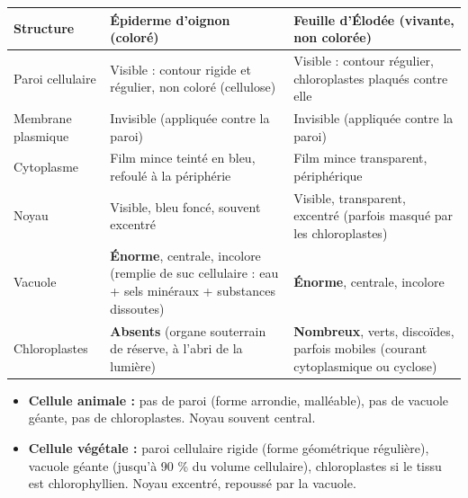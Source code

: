 \documentclass[11pt]{article}
\newcommand{\cle}[1]{{\popxbold\color{popdark}#1}}
\begin{document}
\begin{center}
\begin{tabularx}{\linewidth}{|l|X|X|}
\hline
\rowcolor{popblueL}
\textbf{Structure} & \textbf{Épiderme d'oignon (coloré)} & \textbf{Feuille d'Élodée (vivante, non colorée)} \\
\hline
\cle{Paroi cellulaire} & Visible : contour rigide et régulier, non coloré (cellulose) & Visible : contour régulier, chloroplastes plaqués contre elle \\
\hline
\cle{Membrane plasmique} & Invisible (appliquée contre la paroi) & Invisible (appliquée contre la paroi) \\
\hline
\cle{Cytoplasme} & Film mince teinté en bleu, refoulé à la périphérie & Film mince transparent, périphérique \\
\hline
\cle{Noyau} & Visible, bleu foncé, souvent excentré & Visible, transparent, excentré (parfois masqué par les chloroplastes) \\
\hline
\cle{Vacuole} & \textbf{Énorme}, centrale, incolore (remplie de suc cellulaire : eau + sels minéraux + substances dissoutes) & \textbf{Énorme}, centrale, incolore \\
\hline
\cle{Chloroplastes} & \textbf{Absents} (organe souterrain de réserve, à l'abri de la lumière) & \textbf{Nombreux}, verts, discoïdes, parfois mobiles (courant cytoplasmique ou cyclose) \\
\hline
\end{tabularx}
\end{center}

\begin{aretenir}
\begin{itemize}
    \item \textbf{Cellule animale :} pas de paroi (forme arrondie, malléable), pas de vacuole géante, pas de chloroplastes. Noyau souvent central.
    \item \textbf{Cellule végétale :} \cle{paroi cellulaire} rigide (forme géométrique régulière), \cle{vacuole} géante (jusqu'à 90 \% du volume cellulaire), \cle{chloroplastes} si le tissu est chlorophyllien. Noyau excentré, repoussé par la vacuole.
\end{itemize}
\end{aretenir}
\end{document}
